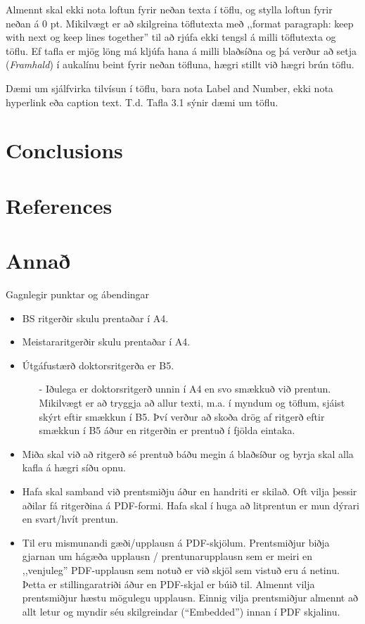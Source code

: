 \documentclass[a4paper,12pt,twoside,BCOR=10mm]{scrbook}
\begin{document}
Almennt skal ekki nota loftun fyrir neðan texta í töflu, og stylla loftun fyrir neðan á 0 pt.
Mikilvægt er að skilgreina töflutexta með ,,format paragraph: keep with next og keep lines together” til að rjúfa ekki tengsl á milli töflutexta og töflu. Ef tafla er mjög löng má kljúfa hana á milli blaðsíðna og þá verður að setja (\textit{Framhald}) í aukalínu beint fyrir neðan töfluna, hægri stillt við hægri brún töflu.

Dæmi um sjálfvirka tilvísun í töflu, bara nota Label and Number, ekki nota hyperlink eða caption text. T.d. Tafla 3.1 sýnir dæmi um töflu.

\chapter{Conclusions}

\chapter{References}

\appendix
\renewcommand{\chaptername}{Appendix}
\chapter{Annað}
Gagnlegir punktar og ábendingar
\begin{itemize}
 \item BS ritgerðir skulu prentaðar í A4.
 \item Meistararitgerðir skulu prentaðar í A4.
 \item Útgáfustærð doktorsritgerða er B5.
\begin{itemize}
 \item[-] Iðulega er doktorsritgerð unnin í A4 en svo smækkuð við prentun. Mikilvægt er að tryggja að allur texti, m.a. í myndum og töflum, sjáist skýrt eftir smækkun í B5. Því verður að skoða drög af ritgerð eftir smækkun í B5 áður en ritgerðin er prentuð í fjölda eintaka.
\end{itemize}

\end{itemize}

\begin{itemize}
 \item Miða skal við að ritgerð sé prentuð báðu megin á blaðsíður og byrja skal alla kafla á hægri síðu opnu.
 \item Hafa skal samband við prentsmiðju áður en handriti er skilað. Oft vilja þessir aðilar fá ritgerðina á PDF-formi. Hafa skal í huga að litprentun er mun dýrari en svart/hvít prentun. 
 \item Til eru mismunandi gæði/upplausn á PDF-skjölum. Prentsmiðjur biðja gjarnan um hágæða upplausn / prentunarupplausn sem er meiri en ,,venjuleg” PDF-upplausn sem notuð er við skjöl sem vistuð eru á netinu. Þetta er stillingaratriði áður en PDF-skjal er búið til. Almennt vilja prentsmiðjur hæstu mögulegu upplausn. Einnig vilja prentsmiðjur almennt að allt letur og myndir séu skilgreindar (“Embedded”) innan í PDF skjalinu.
\end{itemize}
\end{document}
